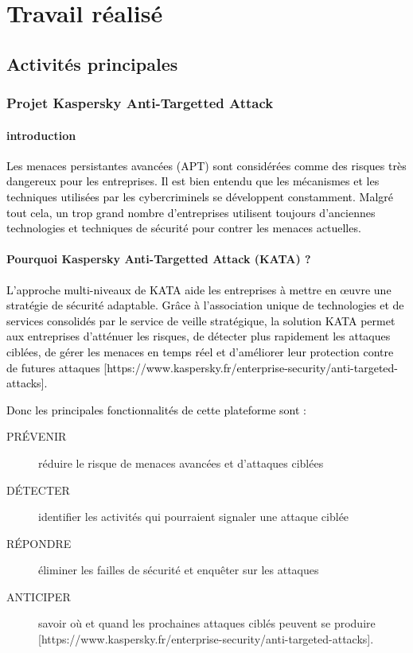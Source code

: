 
\chapter{Travail réalisé }
\vspace{-1cm}
\section{Activités principales}
\subsection{Projet Kaspersky Anti-Targetted Attack}

\subsubsection*{\textbf{introduction}}

\textcolor{black}{Les menaces persistantes avancées (APT) sont considérées comme des risques très dangereux pour les entreprises.}
\textcolor{black}{Il est bien entendu que les mécanismes et les techniques utilisées par les cybercriminels se développent constamment. Malgré tout cela, un trop grand nombre d'entreprises utilisent toujours d'anciennes technologies et techniques de sécurité pour contrer les menaces actuelles.}

\subsubsection*{\textbf{Pourquoi Kaspersky Anti-Targetted Attack (KATA) ?} }

\textcolor{black}{L’approche multi-niveaux de KATA aide les entreprises à mettre en œuvre une stratégie de sécurité adaptable. Grâce à l'association unique de technologies et de services consolidés par le service de veille stratégique, la solution KATA permet aux entreprises d’atténuer les risques, de détecter plus rapidement les attaques ciblées, de gérer les menaces en temps réel et d’améliorer leur protection contre de futures attaques [https://www.kaspersky.fr/enterprise-security/anti-targeted-attacks].}

\textcolor{black}{Donc les principales fonctionnalités de cette plateforme sont :}
\begin{description}
	\item [PRÉVENIR ] réduire le risque de menaces avancées et d'attaques ciblées 
	\item [DÉTECTER] identifier les activités qui pourraient signaler une attaque ciblée
	\item [RÉPONDRE] éliminer les failles de sécurité et enquêter sur les attaques 
	\item [ANTICIPER] savoir où et quand les prochaines attaques ciblés peuvent se produire
	[https://www.kaspersky.fr/enterprise-security/anti-targeted-attacks].
\end{description}

